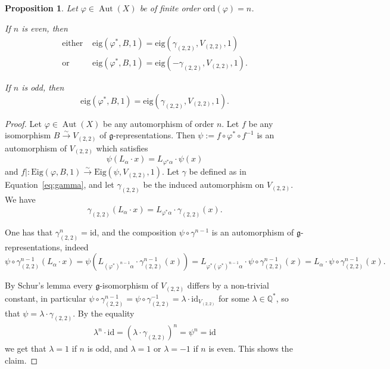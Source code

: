 \documentclass[a4paper,11pt]{amsart}
\newcommand{\eig}{{\mathrm{eig}}}
\newcommand{\Eig}{{\mathrm{Eig}}}
\newcommand{\V}[2]{V_{(#1,#2)}}
\newcommand{\kg}{{\mathfrak g}}
\newcommand{\Aut}{\operatorname{Aut}}
\newcommand{\ord}{{\mathrm{ord}}}
\theoremstyle{plain}
\newtheorem{proposition}[satz]{Proposition}
\theoremstyle{remark}
\begin{document}
\begin{proposition}\label{prop: B-V22-compatibility}
    Let $\varphi\in \Aut (X)$ be of finite order $\ord (\varphi)=n$.
    
    If $n$ is even, then
    \begin{align*}
    \text{either }  &\eig(\varphi^*, B, 1) = \eig (\gamma_{(2,2)}, \V22, 1) \\
    \text{or } &\eig(\varphi^*, B, 1) = \eig (-\gamma_{(2,2)}, \V22, 1).
    \end{align*}
    
    If $n$ is odd, then
    \[
    \eig(\varphi^*, B, 1) = \eig (\gamma_{(2,2)}, \V22, 1).
    \]
\end{proposition}

\begin{proof}
    Let $\varphi\in \Aut(X)$ be any automorphism of order $n$. Let $f$ be any isomorphism $B\xrightarrow{\sim} \V22$ of $\kg$-representations. Then $\psi := f\circ \varphi^*\circ f^{-1}$ is an automorphism of $\V22$ which satisfies
    \[
    \psi (L_\alpha \cdot x) = L_{\varphi^*\alpha} \cdot \psi (x)
    \]
    and $f|\colon \Eig(\varphi, B,1) \xrightarrow{\sim} \Eig(\psi,\V22,1)$.
    Let $\gamma$ be defined as in Equation~\eqref{eq:gamma}, and let $\gamma_{(2,2)}$ be the induced automorphism on $\V22$. We have
    \[
    \gamma_{(2,2)} (L_\alpha \cdot x) = L_{\varphi^*\alpha} \cdot \gamma_{(2,2)} (x).
    \]

One has that $\gamma_{(2,2)}^n = \mathrm{id}$, and the composition $\psi\circ \gamma^{n-1}$ is an automorphism of $\kg$-representations, indeed
\[
\psi\circ\gamma_{(2,2)}^{n-1} (L_\alpha \cdot x) =
\psi(L_{(\varphi^*)^{n-1}\alpha} \cdot \gamma_{(2,2)}^{n-1}(x)) =
L_{\varphi^*(\varphi^*)^{n-1}\alpha} \cdot \psi \circ\gamma_{(2,2)}^{n-1}(x) =
L_\alpha \cdot \psi \circ\gamma_{(2,2)}^{n-1}(x).
\]

By Schur's lemma every $\kg$-isomorphism of $\V22$ differs by a non-trivial constant, in particular  $\psi\circ \gamma_{(2,2)}^{n-1} = \psi \circ \gamma_{(2,2)}^{-1}=\lambda\cdot\mathrm{id}_{\V22}$ for some $\lambda\in \mathbb Q^*$, so that $\psi = \lambda \cdot \gamma_{(2,2)}$. By the equality 
\begin{align*}
\lambda^n\cdot\mathrm{id} = (\lambda\cdot \gamma_{(2,2)})^n   = \psi^n = \mathrm{id}
\end{align*}
we get that $\lambda =1$ if $n$ is odd, and $\lambda= 1$ or $\lambda=-1$ if $n$ is even. This shows the claim.
\end{proof}
\end{document}
